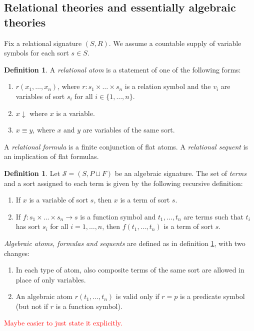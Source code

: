\documentclass[a4paper]{article}
\newcommand{\todo}[1]{\textcolor{red}{#1}}
\theoremstyle{remark}
\theoremstyle{definition}
\newtheorem{definition}[theorem]{Definition}
\begin{document}
\subsection{Relational theories and essentially algebraic theories}

Fix a relational signature $(S, R)$.
We assume a countable supply of variable symbols for each sort $s \in S$.
\begin{definition}
  \label{def:relational-syntax}
  A \emph{relational atom} is a statement of one of the following forms:
  \begin{enumerate}
    \item
      \label{itm:relation-atom}
      $r(x_1, \dots, x_n)$, where $r : s_1 \times \dots \times s_n$ is a relation symbol and the $v_i$ are variables of sort $s_i$ for all $i \in \{1, \dots, n\}$.
    \item
      $x \downarrow$ where $x$ is a variable.
    \item
      $x \equiv y$, where $x$ and $y$ are variables of the same sort.
  \end{enumerate}
  A \emph{relational formula} is a finite conjunction of flat atoms.
  A \emph{relational sequent} is an implication of flat formulas.
\end{definition}

\begin{definition}
  Let $\mathcal{S} = (S, P \sqcup F)$ be an algebraic signature.
  The set of \emph{terms} and a sort assigned to each term is given by the following recursive definition:
  \begin{enumerate}
    \item
      If $x$ is a variable of sort $s$, then $x$ is a term of sort $s$.
    \item
      If $f : s_1 \times \dots \times s_n \rightarrow s$ is a function symbol and $t_1, \dots, t_n$ are terms such that $t_i$ has sort $s_i$ for all $i = 1, \dots, n$, then $f(t_1, \dots, t_n)$ is a term of sort $s$.
  \end{enumerate}
  \emph{Algebraic atoms, formulas and sequents} are defined as in definition \ref{def:relational-syntax}, with two changes:
  \begin{enumerate}
    \item
      In each type of atom, also composite terms of the same sort are allowed in place of only variables.
    \item
      An algebraic atom $r(t_1, \dots, t_n)$ is valid only if $r = p$ is a predicate symbol (but not if $r$ is a function symbol).
  \end{enumerate}
  \todo{Maybe easier to just state it explicitly.}
\end{definition}
\end{document}
